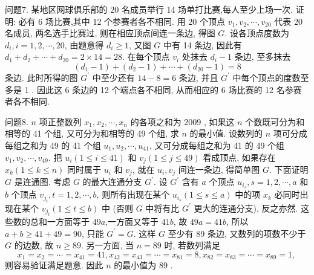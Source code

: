 问题7. 某地区网球俱乐部的 20 名成员举行 14 场单打比赛,每人至少上场一次.
证明: 必有 6 场比赛,其中 12 个参赛者各不相同.
用 20 个顶点 $v_1, v_2, \cdots, v_{20}$ 代表 20 名成员, 两名选手比赛过, 则在相应顶点间连一条边, 得图 $G$.
设各顶点度数为 $d_i, i=1,2, \cdots, 20$, 由题意得 $d_i \geqslant 1$, 又图 $G$ 中有 14 条边, 因此有 $d_1+d_2+\cdots+d_{20}=2 \times 14=28$.
在每个顶点 $v_i$ 处抹去 $d_i-1$ 条边, 至多抹去
$$
\left(d_1-1\right)+\left(d_2-1\right)+\cdots+\left(d_{20}-1\right)=8
$$
条边.
此时所得的图 $G^{\prime}$ 中至少还有 $14-8=6$ 条边, 并且 $G^{\prime}$ 中每个顶点的度数至多是 1 . 因此这 6 条边的 12 个端点各不相同, 从而相应的 6 场比赛的 12 名参赛者各不相同.



问题8. $n$ 项正整数列 $x_1, x_2, \cdots, x_n$ 的各项之和为 2009 , 如果这 $n$ 个数既可分为和相等的 41 个组, 又可分为和相等的 49 个组, 求 $n$ 的最小值.
设数列的 $n$ 项可分成每组之和为 49 的 41 个组 $u_1, u_2, \cdots, u_{41}$, 又可分成每组之和为 41 的 49 个组 $v_1, v_2, \cdots, v_{49}$. 把 $u_i(1 \leqslant i \leqslant 41)$ 和 $v_j(1 \leqslant j \leqslant 49)$ 看成顶点, 如果存在 $x_k(1 \leqslant k \leqslant n)$ 同时属于 $u_i$ 和 $v_j$, 就在 $u_i, v_j$ 间连一条边, 得简单图 $G$. 下面证明 $G$ 是连通图.
考虑 $G$ 的最大连通分支 $G^{\prime}$. 设 $G^{\prime}$ 含有 $a$ 个顶点 $u_{i_s}, s=1,2, \cdots, a$ 和 $b$ 个顶点 $v_{j_t}, t=1,2, \cdots, b$, 则所有出现在某个 $u_{i_s}(1 \leqslant s \leqslant a)$ 中的项 $x_k$ 必同时出现在某个 $v_{j_t}(1 \leqslant t \leqslant b)$ 中 (否则 $G$ 中将有比 $G^{\prime}$ 更大的连通分支), 反之亦然.
这些数的总和一方面等于 $49 a$,一方面又等于 $41 b$, 故 $49 a=41 b$, 所以 $a+b \geqslant 41+49=90$, 只能 $G^{\prime}=G$. 这样 $G$ 至少有 89 条边, 又数列的项数不少于 $G$ 的边数, 故 $n \geqslant 89$.
另一方面, 当 $n=89$ 时, 若数列满足
$$
x_1=x_2=\cdots=x_{41}=41, x_{42}=x_{43}=\cdots=x_{81}=8, x_{82}=x_{83}=\cdots=x_{89}=1 \text {, }
$$
则容易验证满足题意.
因此 $n$ 的最小值为 89 .



